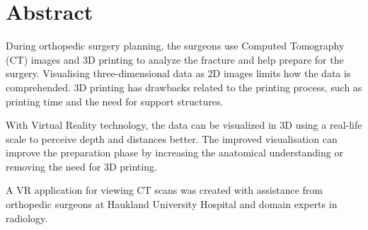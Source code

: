 \documentclass[a4paper]{report}
\begin{document}
%
%


\makeatletter
{}
\def\lst@SkipToFirst{%
    \lst@ifmatchrangestart\c@lstnumber=\numexpr-1+\lst@firstline\fi
    \ifnum \lst@lineno<\lst@firstline
        \def\lst@next{\lst@BeginDropInput\lst@Pmode
        \lst@Let{13}\lst@MSkipToFirst
        \lst@Let{10}\lst@MSkipToFirst}%
        \expandafter\lst@next
    \else
        \expandafter\lst@BOLGobble
    \fi}
\makeatother



\titlePage
\pagebreak

\section*{Abstract}
During orthopedic surgery planning, the surgeons use Computed Tomography (CT) images and 3D printing to analyze the fracture and help prepare for the surgery.
Visualising three-dimensional data as 2D images limits how the data is comprehended. 3D printing has drawbacks related to the printing process, such as printing time and the need for support structures.

With Virtual Reality technology, the data can be visualized in 3D using a real-life scale to perceive depth and distances better. The improved visualisation can improve the preparation phase by increasing the anatomical understanding or removing the need for 3D printing.

A VR application for viewing CT scans was created with assistance from orthopedic surgeons at Haukland University Hospital and domain experts in radiology.
\end{document}
